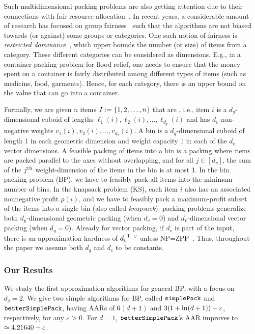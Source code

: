 Such multidimensional packing problems are also getting attention due to their
connections with fair resource allocation~\cite{fairknap}.
In recent years, a considerable amount of research has focused on
group fairness~\cite{JosephKMR16,TsangWRTZ19} such that the algorithms are
not biased towards (or against) some groups or categories.
One such notion of fairness is \emph{restricted dominance}~\cite{BeraCFN19},
which upper bounds the number (or size) of items from a category.
These different categories can be considered as dimensions.
E.g., in a container packing problem for flood relief,
one needs to ensure that the money spent on a container is fairly distributed among
different types of items (such as medicine, food, garments).
Hence, for each category, there is an upper bound on the value that can go into a container.

Formally, we are given $n$ items $I:=\{1, 2, \dots, n\}$
that are , i.e., item $i$ is a
$d_g$-dimensional cuboid of lengths $\ell_1(i), \ell_2(i), \ldots, \ell_{d_g}(i)$
and has $d_v$ non-negative weights $v_1(i), v_2(i), \ldots, v_{d_v}(i)$.
A  bin is a $d_g$-dimensional cuboid of length 1
in each geometric dimension and weight capacity 1 in each of the $d_v$ vector dimensions.
A feasible packing of items into a bin is a packing where items are packed parallel to the axes
without overlapping, and for all $j \in [d_v]$,
the sum of the $j^{\textrm{th}}$ weight-dimension of the items in the bin is at most 1.
In the  bin packing problem (BP),
we have to feasibly pack all items into the minimum number of bins.
In the  knapsack problem (KS),
each item $i$ also has an associated nonnegative profit $p(i)$,
and we have to feasibly pack a maximum-profit subset of the items into a single bin
(also called \emph{knapsack}).
 packing problems generalize both $d_g$-dimensional geometric packing
(when $d_v=0$) and $d_v$-dimensional vector packing (when $d_g=0$).
Already for vector packing, if $d_v$ is part of the input, there is an approximation
hardness of ${d_v}^{1-\varepsilon}$ unless NP=ZPP~\cite{bansal2016improved}.
Thus, throughout the paper we assume both $d_g$ and $d_v$ to be constants.

\subsubsection{Our Results}

We study the first approximation algorithms for general  BP,
with a focus on $d_g = 2$.
We give two simple algorithms for  BP, called $\operatorname{\mathtt{simplePack}}$
and $\operatorname{\mathtt{betterSimplePack}}$, having AARs of $6(d+1)$ and $3(1+\ln(d+1))+\varepsilon$,
respectively, for any $\varepsilon > 0$.
For $d = 1$, $\operatorname{\mathtt{betterSimplePack}}$'s AAR improves to $\approx 4.21640 + \varepsilon$.

